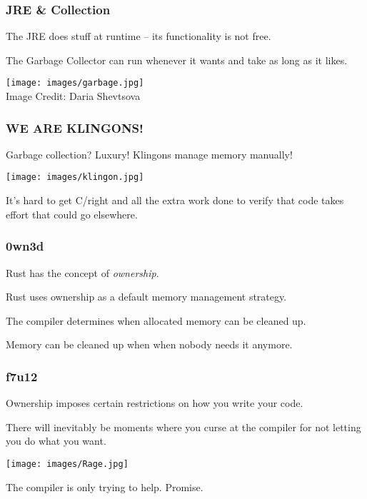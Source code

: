 \begin{frame}
\frametitle{JRE \& Collection}

The JRE does stuff at runtime -- its functionality is not free. 

The Garbage Collector can run whenever it wants and take as long as it likes.

\begin{center}
	\texttt{[image: images/garbage.jpg]}\\
	Image Credit: Daria Shevtsova
\end{center}

\end{frame}


\begin{frame}
\frametitle{WE ARE KLINGONS!}

Garbage collection? Luxury! Klingons manage memory manually!

\begin{center}
	\texttt{[image: images/klingon.jpg]}
\end{center}


It's hard to get C/\CPP right and all the extra work done to verify that code takes effort that could go elsewhere.



\end{frame}


\begin{frame}
\frametitle{0wn3d}

Rust has the concept of \textit{ownership}. 

Rust uses ownership as a default memory management strategy.

The compiler determines when allocated memory can be cleaned up.

Memory  can be cleaned up when when nobody needs it anymore.

\end{frame}


\begin{frame}
\frametitle{f7u12}

Ownership imposes certain restrictions on how you write your code.

There will inevitably be moments where you curse at the compiler for not letting you do what you want.

\begin{center}
	\texttt{[image: images/Rage.jpg]}
\end{center}

The compiler is only trying to help. Promise.

\end{frame}


